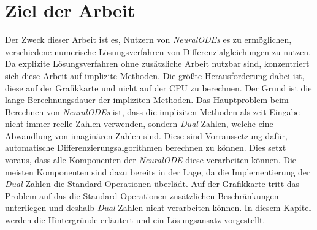 
\section{Ziel der Arbeit}

Der Zweck dieser Arbeit ist es, Nutzern von \textit{NeuralODEs} es zu ermöglichen, 
verschiedene numerische Lösungsverfahren von Differenzialgleichungen zu nutzen.
Da explizite Lösungsverfahren ohne zusätzliche Arbeit nutzbar sind,
konzentriert sich diese Arbeit auf implizite Methoden.
Die größte Herausforderung dabei ist, 
diese auf der Grafikkarte und nicht auf der CPU zu berechnen.
Der Grund ist die lange Berechnungsdauer der impliziten Methoden.
Das Hauptproblem beim Berechnen von \textit{NeuralODEs} ist, 
dass die impliziten Methoden als zeit Eingabe nicht immer reelle Zahlen verwenden,
sondern \textit{Dual}-Zahlen, welche eine Abwandlung von imaginären Zahlen sind.
Diese sind Vorraussetzung dafür, 
automatische Differenzierungsalgorithmen berechnen zu können.
Dies setzt voraus, dass alle Komponenten der \textit{NeuralODE} diese verarbeiten können.
Die meisten Komponenten sind dazu bereits in der Lage, 
da die Implementierung der \textit{Dual}-Zahlen
die Standard Operationen überlädt.
Auf der Grafikkarte tritt das Problem auf das die Standard Operationen 
zusätzlichen Beschränkungen unterliegen 
und deshalb \textit{Dual}-Zahlen nicht verarbeiten können.
In diesem Kapitel werden die Hintergründe erläutert und ein Lösungsansatz vorgestellt.

